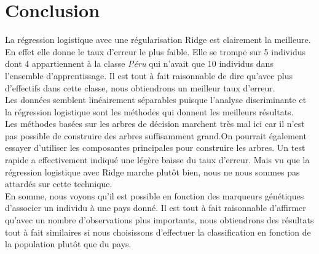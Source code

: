 \documentclass[12pt,a4paper]{article}
\begin{document}
\section{Conclusion}
La régression logistique avec une régularisation Ridge est clairement la meilleure. En effet elle donne le taux d'erreur le plus faible. Elle se trompe sur 5 individus dont 4 appartiennent à la classe \textit{Péru} qui n'avait que 10 individus dans l'ensemble d'apprentissage. Il est tout à fait raisonnable de dire qu'avec plus d'effectifs dans cette classe, nous obtiendrons un meilleur taux d'erreur.\vspace{3mm}\\
Les données semblent linéairement séparables puisque l'analyse discriminante et la régression logistique sont les méthodes qui donnent les meilleurs résultats.\\
Les méthodes basées sur les arbres de décision marchent très mal ici car il n'est pas possible de construire des arbres suffisamment grand.On pourrait également essayer d'utiliser les composantes principales pour construire les arbres. Un test rapide a effectivement indiqué une légère baisse du taux d'erreur. Mais vu que la régression logistique avec Ridge marche plutôt bien, nous ne nous sommes pas attardés sur cette technique.\vspace{3mm}\\
En somme, nous voyons qu'il est possible en fonction des marqueurs génétiques d'associer un individu à une pays donné. Il est tout à fait raisonnable d'affirmer qu'avec un nombre d'observations plus importants, nous obtiendrons des résultats tout à fait similaires si nous choisissons d'effectuer la classification en fonction de la population plutôt que du pays.
\end{document}
